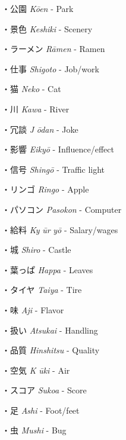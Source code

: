 \par{・公園 \emph{Kōen }- Park }

\par{・景色 \emph{Keshiki }- Scenery }

\par{・ラーメン \emph{Rāmen }- Ramen }

\par{・仕事 \emph{Shigoto }- Job\slash work }

\par{・猫 \emph{Neko }- Cat }

\par{・川 \emph{Kawa }- River }

\par{・冗談 \emph{J }\emph{ōdan }- Joke }

\par{・影響 \emph{Eikyō }- Influence\slash effect }

\par{・信号 \emph{Shingō }- Traffic light }

\par{・リンゴ \emph{Ringo }- Apple }

\par{・パソコン \emph{Pasokon }- Computer }

\par{・給料 \emph{Ky }\emph{ūr }\emph{yō }- Salary\slash wages }

\par{・城 \emph{Shiro }- Castle }

\par{・葉っぱ \emph{Happa }- Leaves }

\par{・タイヤ \emph{Taiya }- Tire }

\par{・味 \emph{Aji }- Flavor }

\par{・扱い \emph{Atsukai }- Handling }

\par{・品質 \emph{Hinshitsu }- Quality }

\par{・空気 \emph{K }\emph{ūki } - Air }

\par{・スコア \emph{Sukoa }- Score }

\par{・足 \emph{Ashi }- Foot\slash feet }

\par{・虫 \emph{Mushi }- Bug }

